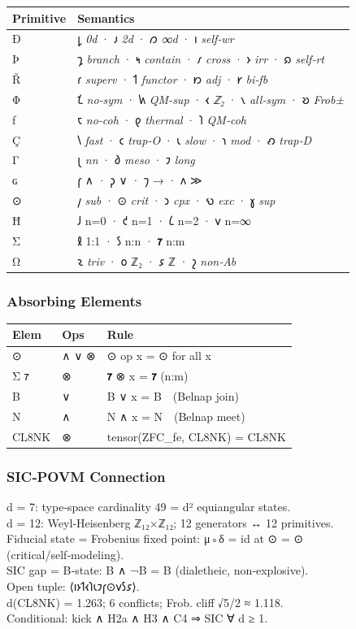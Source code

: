 \begin{longtable}[]{@{}ll@{}}
\toprule
Primitive & Semantics\tabularnewline
\midrule
\endhead
Ð & 𐑛 \emph{0d} · 𐑨 \emph{2d} · 𐑼 \emph{∞d} · 𐑦
\emph{self‑wr}\tabularnewline
Þ & 𐑡 \emph{branch} · 𐑰 \emph{contain} · 𐑥 \emph{cross} · 𐑶 \emph{irr} ·
𐑸 \emph{self‑rt}\tabularnewline
Ř & 𐑩 \emph{superv} · 𐑑 \emph{functor} · 𐑽 \emph{adj} · 𐑾
\emph{bi‑fb}\tabularnewline
Φ & 𐑗 \emph{no‑sym} · 𐑿 \emph{QM‑sup} · 𐑬 \emph{ℤ₂} · 𐑯 \emph{all‑sym} ·
𐑹 \emph{Frob±}\tabularnewline
ƒ & 𐑱 \emph{no‑coh} · 𐑞 \emph{thermal} · 𐑐 \emph{QM‑coh}\tabularnewline
Ç & 𐑘 \emph{fast} · 𐑤 \emph{trap‑O} · 𐑧 \emph{slow} · 𐑪 \emph{mod} · 𐑺
\emph{trap‑D}\tabularnewline
Γ & 𐑚 \emph{nn} · 𐑔 \emph{meso} · 𐑲 \emph{long}\tabularnewline
ɢ & 𐑝 ∧ · 𐑜 ∨ · 𐑠 → · 𐑵 ≫\tabularnewline
⊙ & 𐑢 \emph{sub} · ⊙ \emph{crit} · 𐑮 \emph{cpx} · 𐑻 \emph{exc} · 𐑣
\emph{sup}\tabularnewline
Ħ & 𐑓 n=0 · 𐑒 n=1 · 𐑖 n=2 · 𐑫 n=∞\tabularnewline
Σ & 𐑙 1:1 · 𐑕 n:n · \textbf{𐑳} n:m\tabularnewline
Ω & 𐑷 \emph{triv} · 𐑴 ℤ₂ · 𐑭 ℤ · 𐑟 \emph{non‑Ab}\tabularnewline
\bottomrule
\end{longtable}

\hypertarget{absorbing-elements}{%
\subsubsection{Absorbing Elements}\label{absorbing-elements}}

\begin{longtable}[]{@{}lll@{}}
\toprule
Elem & Ops & Rule\tabularnewline
\midrule
\endhead
⊙ & ∧ ∨ ⊗ & ⊙ op x = ⊙ for all x\tabularnewline
Σ 𐑳 & ⊗ & \textbf{𐑳} ⊗ x = \textbf{𐑳} (n:m)\tabularnewline
B & ∨ & B ∨ x = B (Belnap join)\tabularnewline
N & ∧ & N ∧ x = N (Belnap meet)\tabularnewline
CL8NK & ⊗ & tensor(ZFC\_fe, CL8NK) = CL8NK\tabularnewline
\bottomrule
\end{longtable}

\hypertarget{sicpovm-connection}{%
\subsubsection{SIC‑POVM Connection}\label{sicpovm-connection}}

d = 7: type‑space cardinality 49 = d² equiangular states.\\
d = 12: Weyl‑Heisenberg ℤ₁₂×ℤ₁₂; 12 generators ↔ 12 primitives.\\
Fiducial state = Frobenius fixed point: μ◦δ = id at ⊙ = ⊙
(critical/self‑modeling).\\
SIC gap = B‑state: B ∧ ¬B = B (dialetheic, non‑explosive).\\
Open tuple: ⟨𐑦𐑶𐑑𐑬𐑐𐑧𐑲𐑝⊙𐑫𐑕𐑭⟩.\\
d(CL8NK) = 1.263; 6 conflicts; Frob. cliff √5/2 ≈ 1.118.\\
Conditional: kick ∧ H2a ∧ H3 ∧ C4 ⇒ SIC ∀ d ≥ 1.

